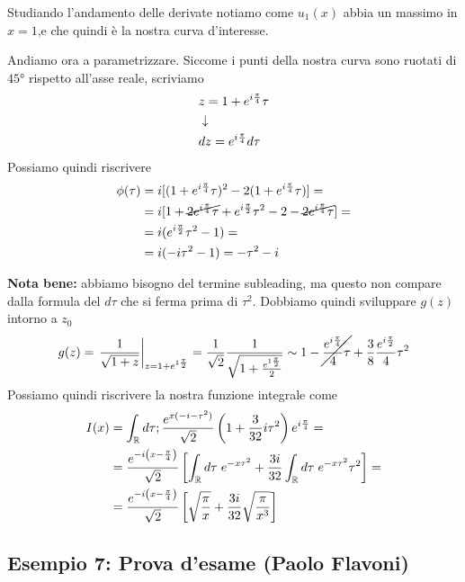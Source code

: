 Studiando l'andamento delle derivate notiamo come $u_1(x)$ abbia un massimo in $x=1$,e che quindi è la nostra curva d'interesse.

Andiamo ora a parametrizzare. Siccome i punti della nostra curva sono ruotati di $45°$ rispetto all'asse reale, scriviamo
\begin{align}
	&z = 1+ e^{i\frac{\pi}{4}} \tau\\ &\downarrow \nonumber \\
	&dz = e^{i\frac{\pi}{4}} d\tau
\end{align}	
Possiamo quindi riscrivere
\begin{align}	
	\phi(\tau) &= i[(1+ e^{i\frac{\pi}{4}} \tau)^2-2(1+ e^{i\frac{\pi}{4}} \tau)] =\nonumber\\
	&= i[ 1 + \cancel{2e^{i\frac{\pi}{4}}\tau} + e^{i\frac{\pi}{2}}\tau^2 - 2 -\cancel{2e^{i\frac{\pi}{4}}\tau} ]=\nonumber\\
	&= i (e^{i\frac{\pi}{2}}\tau^2 -1)=\nonumber\\
	&= i (-i\tau^2 -1) = -\tau^2 -i
\end{align}

\textbf{Nota bene:} abbiamo bisogno del termine subleading, ma questo non compare dalla formula del $d\tau$ che si ferma prima di $\tau^2$. Dobbiamo quindi sviluppare $g(z)$ intorno a $z_0$
\begin{align}
	g(z) = \left. \frac{1}{\sqrt{1+z}} \right|_{z=1 + e^{1\frac{\pi}{2}}} = \frac{1}{\sqrt{2}} \frac{1}{\sqrt{1 + \frac{e^{1\frac{\pi}{2}}}{2}}} \sim 1 - \cancel{\frac{e^{i\frac{\pi}{4}}}{4}\tau} + \frac{3}{8} \frac{e^{i\frac{\pi}{2}}}{4} \tau^2
\end{align}
Possiamo quindi riscrivere la nostra funzione integrale come
\begin{align}
	I(x) &= \int_{\mathbb{R}} d\tau; \frac{e^{x(-i-\tau^2)}}{\sqrt{2}} \left( 1  + \frac{3}{32} i \tau^2 \right)e^{i\frac{\pi}{4}} = \nonumber \\
	&= \frac{e^{-i\left( x-\frac{\pi}{4} \right)}}{\sqrt{2}}\left[ \int_{\mathbb{R}} d\tau  \; e^{-x\tau^2}  + \frac{3i}{32} \int_{\mathbb{R}} d\tau \; e^{-x\tau^2} \tau^2\right] = \nonumber \\
	&= \frac{e^{-i\left( x-\frac{\pi}{4} \right)}}{\sqrt{2}}\left[ \sqrt{\frac{\pi}{x}}   + \frac{3i}{32} \sqrt{\frac{\pi}{x^3}} \right]
\end{align}

\newpage

\subsection{Esempio 7: Prova d'esame (Paolo Flavoni)}

